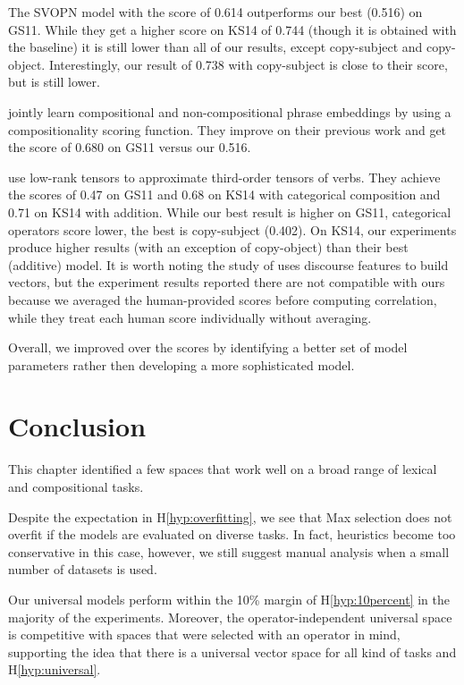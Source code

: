 The SVOPN model with the score of 0.614 outperforms our best (0.516) on GS11. While they get a higher score on KS14 of 0.744 (though it is obtained with the  baseline) it is still lower than all of our results, except copy-subject and copy-object. Interestingly, our result of 0.738 with copy-subject is close to their score, but is still lower.

 jointly learn compositional and non-compositional phrase embeddings by using a compositionality scoring function. They improve on their previous work and get the score of 0.680 on GS11 versus our 0.516.

 use low-rank tensors to approximate third-order tensors of verbs. They achieve the scores of 0.47 on GS11 and 0.68 on KS14 with categorical composition and 0.71 on KS14 with addition. While our best result is higher on GS11, categorical operators score lower, the best is copy-subject (0.402). On KS14, our experiments produce higher results (with an exception of copy-object) than their best (additive) model. It is worth noting the study of  uses discourse features to build vectors, but the experiment results reported there are not compatible with ours because we averaged the human-provided scores before computing correlation, while they treat each human score individually without averaging.

Overall, we improved over the scores by identifying a better set of model
parameters rather then developing a more sophisticated model.

\section{Conclusion}
\label{sec:conclusion-universal}

This chapter identified a few spaces that work well on a broad range of lexical and compositional tasks.

Despite the expectation in H\ref{hyp:overfitting}, we see that Max selection does not overfit if the models are evaluated on diverse tasks. In fact, heuristics become too conservative in this case, however, we still suggest manual analysis when a small number of datasets is used.

Our universal models perform within the 10\% margin of H\ref{hyp:10percent} in the majority of the experiments. Moreover, the operator-independent universal space is competitive with spaces that were selected with an operator in mind, supporting the idea that there is a universal vector space for all kind of tasks and H\ref{hyp:universal}.

